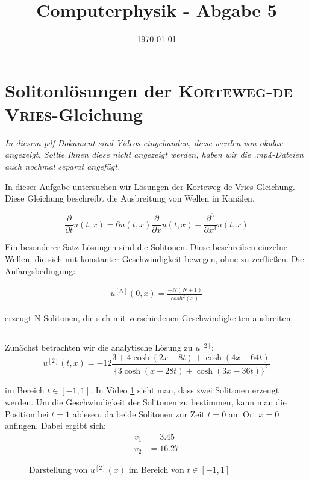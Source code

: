\documentclass[ngerman]{scrartcl}
\title{Computerphysik - Abgabe 5}
\date{\today}
\begin{document}
	\setcounter{section}{9}
	\thispagestyle{fancy}
	\renewcommand{\thesection}{H.\arabic{section}:}
	\renewcommand{\thesubsection}{H\arabic{section}.\arabic{subsection}}
	
\section{Solitonlösungen der \textsc{Korteweg-de Vries}-Gleichung}

\textit{In diesem pdf-Dokument sind Videos eingebunden, diese werden von \emph{okular} angezeigt. Sollte Ihnen diese nicht angezeigt werden, haben wir die .mp4-Dateien auch nochmal separat angefügt.}

In dieser Aufgabe untersuchen wir Lösungen der Korteweg-de Vries-Gleichung.
Diese Gleichung beschreibt die Ausbreitung von Wellen in Kanälen.

\begin{equation*}
\frac{\partial}{\partial t} u(t, x)=6 u(t, x) \frac{\partial}{\partial x} u(t, x)-\frac{\partial^{3}}{\partial x^{3}} u(t, x)
\end{equation*}

Ein besonderer Satz Lösungen sind die Solitonen.
Diese beschreiben einzelne Wellen, die sich mit konstanter Geschwindigkeit bewegen, ohne zu zerfließen.
Die Anfangsbedingung:

\begin{align}
	u^{[N]}(0,x)=\frac{-N(N+1)}{cosh^2(x)}
\end{align}

erzeugt N Solitonen, die sich mit verschiedenen Geschwindigkeiten ausbreiten.
\subsection{}

Zunächst betrachten wir die analytische Lösung zu $u^{[2]}$:
\begin{equation*}
u^{[2]}(t, x)=-12 \frac{3+4 \cosh (2 x-8 t)+\cosh (4 x-64 t)}{\{3 \cosh (x-28 t)+\cosh (3 x-36 t)\}^{2}}
\end{equation*}

im Bereich $t\in[-1,1]$. 
In Video \ref{vid:H10.1} sieht man, dass zwei Solitonen erzeugt werden.
Um die Geschwindigkeit der Solitonen zu bestimmen, kann man die Position bei $t=1$ ablesen,
da beide Solitonen zur Zeit $t=0$ am Ort $x=0$ anfingen. Dabei ergibt sich:
\begin{align*}
	v_1&=3.45\\
	v_2&=16.27
\end{align*}
\begin{figure}[htbp]
	\centering
	\caption[2 Solitonen]{Darstellung von $u^{[2]}(x)$ im Bereich von $t\in[-1,1]$}
	\label{vid:H10.1}
\end{figure}
\end{document}
